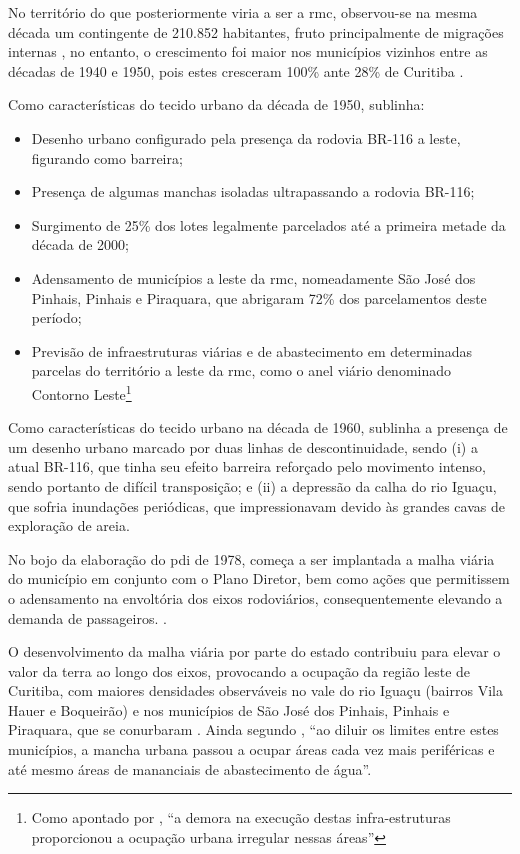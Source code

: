 	No território do que posteriormente viria a ser a \gls{rmc}, observou-se na mesma década um contingente de 210.852 habitantes, fruto principalmente de migrações internas \cite[p. 53]{castro2005a}, no entanto, o crescimento foi maior nos municípios vizinhos entre as décadas de 1940 e 1950, pois estes cresceram 100\% ante 28\% de Curitiba .
	
	Como características do tecido urbano da década de 1950,  sublinha:
	
	\begin{itemize}
		\item Desenho urbano configurado pela presença da rodovia BR-116 a leste, figurando como barreira;
		\item Presença de algumas manchas isoladas ultrapassando a rodovia BR-116;
		\item Surgimento de 25\% dos lotes legalmente parcelados até a primeira metade da década de 2000;
		\item Adensamento de municípios a leste da \gls{rmc}, nomeadamente São José dos Pinhais, Pinhais e Piraquara, que abrigaram 72\% dos parcelamentos deste período;
		\item Previsão de infraestruturas viárias e de abastecimento em determinadas parcelas do território a leste da \gls{rmc}, como o anel viário denominado Contorno Leste\footnote{Como apontado por , ``a demora na execução destas infra-estruturas proporcionou a ocupação urbana irregular nessas áreas''}
	\end{itemize}

	Como características do tecido urbano na década de 1960,  sublinha a presença de um desenho urbano marcado por duas linhas de descontinuidade, sendo (i) a atual BR-116, que tinha seu efeito barreira reforçado pelo movimento intenso, sendo portanto de difícil transposição; e (ii) a depressão da calha do rio Iguaçu, que sofria inundações periódicas, que impressionavam devido às grandes cavas de exploração de areia.

	No bojo da elaboração do \gls{pdi} de 1978, começa a ser implantada a malha viária do município em conjunto com o Plano Diretor, bem como ações que permitissem o adensamento na envoltória dos eixos rodoviários, consequentemente elevando a demanda de passageiros. \cite[p. 53]{castro2005a}.
	
	O desenvolvimento da malha viária por parte do estado contribuiu para elevar o valor da terra ao longo dos eixos, provocando a ocupação da região leste de Curitiba, com maiores densidades observáveis no vale do rio Iguaçu (bairros Vila Hauer e Boqueirão) e nos municípios de São José dos Pinhais, Pinhais e Piraquara, que se conurbaram \cite[p. 54]{castro2005a}. Ainda segundo , ``ao diluir os limites entre estes municípios, a mancha urbana passou a ocupar áreas cada vez mais periféricas e até mesmo áreas de mananciais de abastecimento de água''.
	
